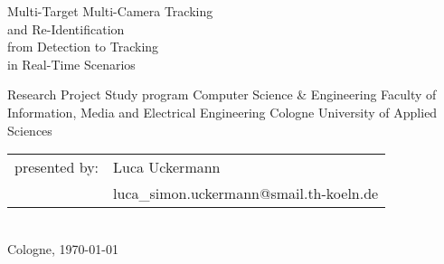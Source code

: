\begin{titlepage}

    \begin{center}
    \end{center}

    \vspace*{10mm}

    \begin{huge}
        \noindent
        Multi-Target Multi-Camera Tracking\\and Re-Identification\\[5mm]from Detection to Tracking\\in Real-Time Scenarios\\[10mm]
    \end{huge}

    Research Project\newline
    Study program Computer Science \& Engineering\newline
    Faculty of Information, Media and Electrical Engineering\newline
    Cologne University of Applied Sciences\\[10mm]

    \begin{tabular}{@{}ll}
        presented by:   & Luca Uckermann                          \\
                        & luca\_simon.uckermann@smail.th-koeln.de \\
    \end{tabular}
    \\[20mm]

    Cologne, \today

\end{titlepage}